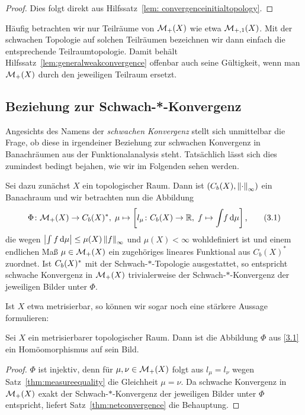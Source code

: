 \documentclass[../main/main.tex]{subfiles}
\begin{document}
	\begin{proof}
		Dies folgt direkt aus Hilfssatz~\ref{lem: convergenceinitialtopology}.
	\end{proof}

	\begin{Bemerkung}
		Häufig betrachten wir nur Teilräume von $\mathcal{M}_{+}(X)$ wie etwa $\mathcal{M}_{+,1}(X)$. Mit der schwachen Topologie auf solchen Teilräumen bezeichnen wir 
		dann einfach die entsprechende Teilraumtopologie. Damit behält Hilfssatz~\ref{lem:generalweakconvergence} offenbar auch seine Gültigkeit, wenn man $\mathcal{M}_{+}(X)$ durch den 
		jeweiligen Teilraum ersetzt.
	\end{Bemerkung}

	\subsection{Beziehung zur Schwach-*-Konvergenz}
	
	Angesichts des Namens der \emph{schwachen Konvergenz} stellt sich unmittelbar die Frage, ob diese in irgendeiner Beziehung zur schwachen Konvergenz in Banachräumen aus der 
	Funktionalanalysis steht. Tatsächlich lässt sich dies zumindest bedingt bejahen, wie wir im Folgenden sehen werden. 
	
	Sei dazu zunächst $X$ ein topologischer Raum. Dann ist $(C_b(X), \left\lVert\cdot\right\rVert_\infty)$ ein Banachraum und wir betrachten nun die Abbildung
	\[\Phi \colon \mathcal{M}_{+}(X) \to C_b(X)^\ast, \; \mu \mapsto \left[l_\mu \colon C_b(X) \to \mathbb{R}, \; f \mapsto \int_{} \, f \, \mathrm{d}\mu \right]  \text{,} \label{3.1} \tag{3.1}\]
	die wegen $\left| \int_{} \, f \, \mathrm{d}\mu \right| \leq \mu(X) \left\lVert f\right\rVert_\infty$ und $\mu(X) < \infty$ wohldefiniert ist 
	und einem endlichen Maß $\mu \in \mathcal{M}_{+}(X)$ ein zugehöriges lineares Funktional aus $C_b(X)^\ast$ zuordnet. 
	Ist $C_b(X)^\ast$ mit der 
	Schwach-$\ast$-Topologie ausgestattet, so entspricht schwache Konvergenz in $\mathcal{M}_{+}(X)$ trivialerweise der 
	Schwach-$\ast$-Konvergenz der jeweiligen Bilder unter $\Phi$.
	
	Ist $X$ etwa metrisierbar, so können wir sogar noch eine stärkere Aussage formulieren:
	
	\begin{Hilfssatz}
		Sei $X$ ein metrisierbarer topologischer Raum. Dann ist die Abbildung $\Phi$ aus \eqref{3.1} ein Homöomorphismus auf sein Bild.
	\end{Hilfssatz}

	\begin{proof}
		$\Phi$ ist injektiv, denn für $\mu, \nu \in \mathcal{M}_{+}(X)$ folgt aus $l_\mu = l_\nu$ wegen Satz~\ref{thm:measureequality} die Gleichheit $\mu = \nu$. 
		Da schwache Konvergenz in $\mathcal{M}_{+}(X)$ exakt der Schwach-$\ast$-Konvergenz der jeweiligen Bilder unter $\Phi$ entspricht, liefert Satz~\ref{thm:netconvergence}
		die Behauptung.
	\end{proof}
\end{document}
